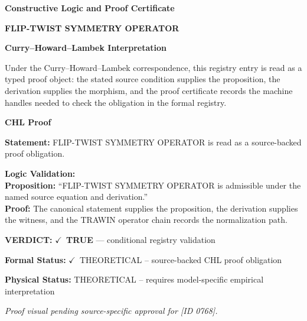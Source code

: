 \clearpage
\begingroup\tzpsupportsetup
\noindent\textbf{\fontsize{10.8pt}{12.8pt}\selectfont [ID 0768] Constructive Logic and Proof Certificate}\par
\noindent\textbf{\fontsize{10pt}{12pt}\selectfont FLIP-TWIST SYMMETRY OPERATOR}\par
\vspace{0.45em}
\begingroup
\footnotesize
\setlength{\parskip}{0.22em}
\setlength{\parindent}{0pt}
\noindent\textbf{Curry--Howard--Lambek Interpretation}\par
Under the Curry--Howard--Lambek correspondence, this registry entry is read as a typed proof
object: the stated source condition supplies the proposition, the derivation supplies the
morphism, and the proof certificate records the machine handles needed to check the obligation
in the formal registry.

\vspace{0.45em}
\noindent\textbf{CHL Proof}\par
\textbf{Statement:} FLIP-TWIST SYMMETRY OPERATOR is read as a source-backed proof obligation.

\textbf{Logic Validation:}\\
\textbf{Proposition:} ``FLIP-TWIST SYMMETRY OPERATOR is admissible under the named source equation and derivation.''\\
\textbf{Proof:} The canonical statement supplies the proposition, the derivation supplies the witness, and the TRAWIN operator chain records the normalization path.

\textbf{VERDICT:} \ensuremath{\checkmark}\ \textbf{TRUE} --- conditional registry validation

\textbf{Formal Status:} \ensuremath{\checkmark}\ THEORETICAL -- source-backed CHL proof obligation

\textbf{Physical Status:} THEORETICAL -- requires model-specific empirical interpretation
\par\vspace{0.45em}
\par
\vfill
\begingroup\footnotesize\itshape
Proof visual pending source-specific approval for [ID 0768].
\par\endgroup
\vfill
\endgroup
\endgroup

